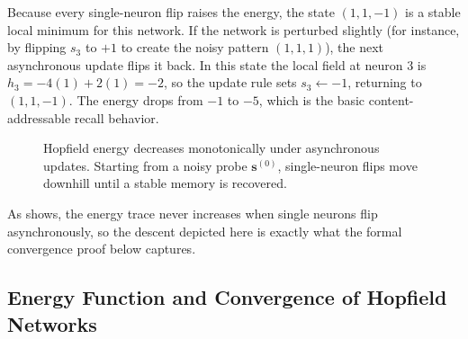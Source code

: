Because every single-neuron flip raises the energy, the state \((1,1,-1)\) is a stable local minimum for this network.
If the network is perturbed slightly (for instance, by flipping \(s_3\) to \(+1\) to create the noisy pattern \((1,1,1)\)), the next asynchronous update flips it back. In this state the local field at neuron 3 is \(h_3=-4(1)+2(1)=-2\), so the update rule sets \(s_3\leftarrow -1\), returning to \((1,1,-1)\). The energy drops from \(-1\) to \(-5\), which is the basic content-addressable recall behavior.

\begin{figure}[t]
    \centering
    \caption{Hopfield energy decreases monotonically under asynchronous updates. Starting from a noisy probe \(\mathbf{s}^{(0)}\), single-neuron flips move downhill until a stable memory is recovered.}
    \label{fig:hopfield-energy-descent}
\end{figure}



As  shows, the energy trace never increases when single neurons flip asynchronously, so the descent depicted here is exactly what the formal convergence proof below captures.

\subsection{Energy Function and Convergence of Hopfield Networks}
\label{sec:hopfield_energy_function_and_convergence_of_hopfield_networks}

